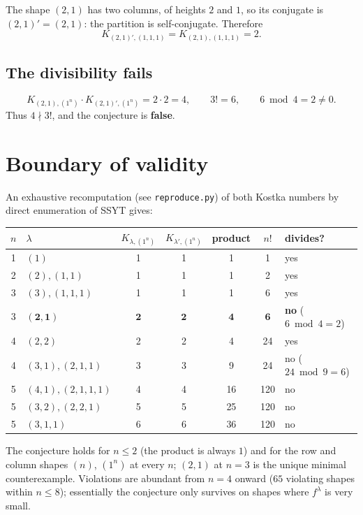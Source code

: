 \documentclass[11pt]{article}
\newcommand{\Kostka}{K}
\newcommand{\shape}{\lambda}
\newcommand{\oneton}{(1^n)}
\begin{document}
The shape $(2,1)$ has two columns, of heights $2$ and $1$, so its conjugate is
$(2,1)' = (2,1)$: the partition is self-conjugate. Therefore
\[
\Kostka_{(2,1)',(1,1,1)} = \Kostka_{(2,1),(1,1,1)} = 2.
\]

\subsection{The divisibility fails}

\[
\Kostka_{(2,1),\oneton}\cdot \Kostka_{(2,1)',\oneton} = 2\cdot 2 = 4,
\qquad
3! = 6,
\qquad
6 \bmod 4 = 2 \neq 0.
\]
Thus $4 \nmid 3!$, and the conjecture is \textbf{false}.

\section{Boundary of validity}

An exhaustive recomputation (see \texttt{reproduce.py}) of both Kostka numbers by direct
enumeration of SSYT gives:

\begin{center}
\begin{tabular}{c l c c c c l}
\hline
$n$ & $\shape$ & $\Kostka_{\shape,\oneton}$ & $\Kostka_{\shape',\oneton}$ & product & $n!$ & divides?\\
\hline
1 & $(1)$ & 1 & 1 & 1 & 1 & yes\\
2 & $(2),(1,1)$ & 1 & 1 & 1 & 2 & yes\\
3 & $(3),(1,1,1)$ & 1 & 1 & 1 & 6 & yes\\
3 & $\mathbf{(2,1)}$ & $\mathbf{2}$ & $\mathbf{2}$ & $\mathbf{4}$ & $\mathbf{6}$ & \textbf{no} ($6 \bmod 4 = 2$)\\
4 & $(2,2)$ & 2 & 2 & 4 & 24 & yes\\
4 & $(3,1),(2,1,1)$ & 3 & 3 & 9 & 24 & no ($24 \bmod 9 = 6$)\\
5 & $(4,1),(2,1,1,1)$ & 4 & 4 & 16 & 120 & no\\
5 & $(3,2),(2,2,1)$ & 5 & 5 & 25 & 120 & no\\
5 & $(3,1,1)$ & 6 & 6 & 36 & 120 & no\\
\hline
\end{tabular}
\end{center}

The conjecture holds for $n \le 2$ (the product is always $1$) and for the row and column
shapes $(n)$, $(1^n)$ at every $n$; $(2,1)$ at $n=3$ is the unique minimal counterexample.
Violations are abundant from $n = 4$ onward ($65$ violating shapes within $n \le 8$);
essentially the conjecture only survives on shapes where $f^{\shape}$ is very small.
\end{document}
